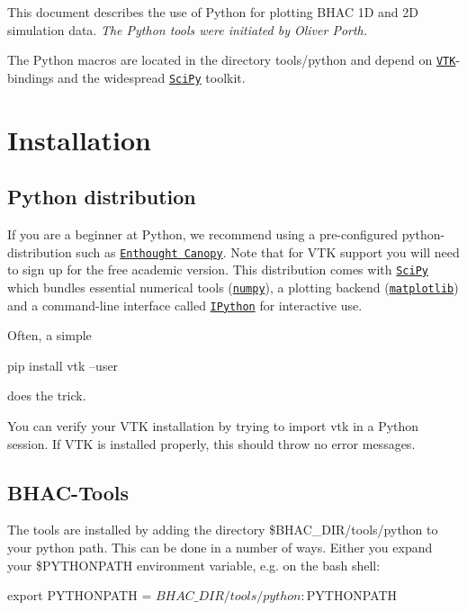 This document describes the use of Python for plotting B\+H\+AC 1D and 2D simulation data. {\itshape The Python tools were initiated by Oliver Porth.}

The Python macros are located in the directory {\ttfamily tools/python} and depend on \href{http://www.vtk.org}{\tt V\+TK}-\/bindings and the widespread \href{http://www.scipy.org/}{\tt Sci\+Py} toolkit.\hypertarget{index_Installation}{}\section{Installation}\label{index_Installation}
\hypertarget{index_distribution}{}\subsection{Python distribution}\label{index_distribution}
If you are a beginner at Python, we recommend using a pre-\/configured python-\/distribution such as \href{https://store.enthought.com/#canopy-academic}{\tt Enthought Canopy}. Note that for V\+TK support you will need to sign up for the free academic version. This distribution comes with \href{http://www.scipy.org/}{\tt Sci\+Py} which bundles essential numerical tools (\href{http://www.numpy.org/}{\tt numpy}), a plotting backend (\href{http://matplotlib.org/}{\tt matplotlib}) and a command-\/line interface called \href{http://ipython.org/}{\tt I\+Python} for interactive use.

Often, a simple 
\begin{DoxyCode}
pip install vtk --user
\end{DoxyCode}
 does the trick.

You can verify your V\+TK installation by trying to {\ttfamily import vtk} in a Python session. If V\+TK is installed properly, this should throw no error messages.\hypertarget{index_BHAC-Tools}{}\subsection{B\+H\+A\+C-\/\+Tools}\label{index_BHAC-Tools}
The tools are installed by adding the directory {\ttfamily \$\+B\+H\+A\+C\+\_\+\+D\+IR/tools/python} to your python path. This can be done in a number of ways. Either you expand your {\ttfamily \$\+P\+Y\+T\+H\+O\+N\+P\+A\+TH} environment variable, e.\+g. on the bash shell\+:


\begin{DoxyCode}
export PYTHONPATH = $BHAC\_DIR/tools/python:$PYTHONPATH
\end{DoxyCode}


